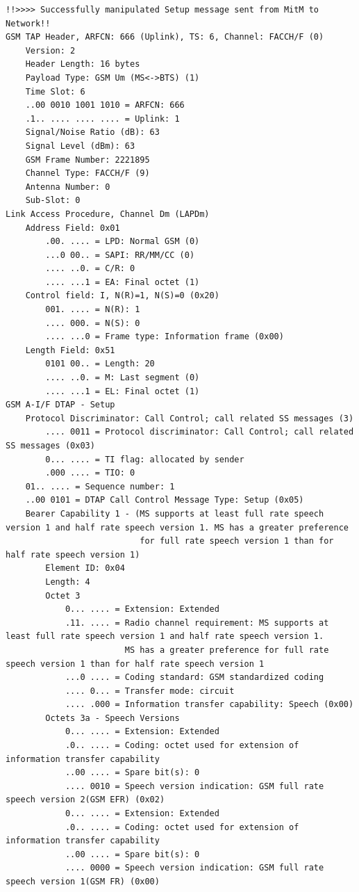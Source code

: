 \begin{lstlisting}
!!>>>> Successfully manipulated Setup message sent from MitM to Network!!
GSM TAP Header, ARFCN: 666 (Uplink), TS: 6, Channel: FACCH/F (0)
    Version: 2
    Header Length: 16 bytes
    Payload Type: GSM Um (MS<->BTS) (1)
    Time Slot: 6
    ..00 0010 1001 1010 = ARFCN: 666
    .1.. .... .... .... = Uplink: 1
    Signal/Noise Ratio (dB): 63
    Signal Level (dBm): 63
    GSM Frame Number: 2221895
    Channel Type: FACCH/F (9)
    Antenna Number: 0
    Sub-Slot: 0
Link Access Procedure, Channel Dm (LAPDm)
    Address Field: 0x01
        .00. .... = LPD: Normal GSM (0)
        ...0 00.. = SAPI: RR/MM/CC (0)
        .... ..0. = C/R: 0
        .... ...1 = EA: Final octet (1)
    Control field: I, N(R)=1, N(S)=0 (0x20)
        001. .... = N(R): 1
        .... 000. = N(S): 0
        .... ...0 = Frame type: Information frame (0x00)
    Length Field: 0x51
        0101 00.. = Length: 20
        .... ..0. = M: Last segment (0)
        .... ...1 = EL: Final octet (1)
GSM A-I/F DTAP - Setup
    Protocol Discriminator: Call Control; call related SS messages (3)
        .... 0011 = Protocol discriminator: Call Control; call related SS messages (0x03)
        0... .... = TI flag: allocated by sender
        .000 .... = TIO: 0
    01.. .... = Sequence number: 1
    ..00 0101 = DTAP Call Control Message Type: Setup (0x05)
    Bearer Capability 1 - (MS supports at least full rate speech version 1 and half rate speech version 1. MS has a greater preference
                           for full rate speech version 1 than for half rate speech version 1)
        Element ID: 0x04
        Length: 4
        Octet 3
            0... .... = Extension: Extended
            .11. .... = Radio channel requirement: MS supports at least full rate speech version 1 and half rate speech version 1.
                        MS has a greater preference for full rate speech version 1 than for half rate speech version 1
            ...0 .... = Coding standard: GSM standardized coding
            .... 0... = Transfer mode: circuit
            .... .000 = Information transfer capability: Speech (0x00)
        Octets 3a - Speech Versions
            0... .... = Extension: Extended
            .0.. .... = Coding: octet used for extension of information transfer capability
            ..00 .... = Spare bit(s): 0
            .... 0010 = Speech version indication: GSM full rate speech version 2(GSM EFR) (0x02)
            0... .... = Extension: Extended
            .0.. .... = Coding: octet used for extension of information transfer capability
            ..00 .... = Spare bit(s): 0
            .... 0000 = Speech version indication: GSM full rate speech version 1(GSM FR) (0x00)

\end{lstlisting}
